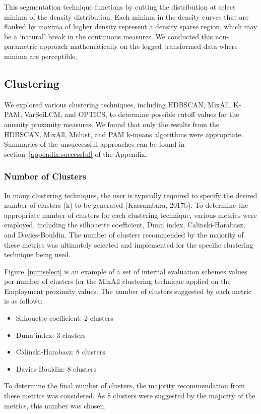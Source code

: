 \documentclass[11pt, a4paper]{article}
\begin{document}
This segmentation technique functions by cutting the distribution at select minima of the density distribution. Each minima in the density curves that are flanked by maxima of higher density represent a density sparse region, which may be a `natural' break in the continuous measures. We conducted this non-parametric approach mathematically on the logged transformed data where minima are perceptible.







\subsection{Clustering}


We explored various clustering techniques, including HDBSCAN, MixAll, K-PAM, VarSelLCM, and OPTICS, to determine possible cutoff values for the amenity proximity measures. We found that only the results from the HDBSCAN, MixAll, Mclust, and PAM k-means algorithms were appropriate. Summaries of the unsuccessful approaches can be found in section~\ref{appendix:successful} of the Appendix.





\subsubsection{Number of Clusters}

In many clustering techniques, the user is typically required to specify the desired number of clusters (k) to be generated (Kassambara, 2017b). To determine the appropriate number of clusters for each clustering technique, various metrics were employed, including the silhouette coefficient, Dunn index, Calinski-Harabasz, and Davies-Bouldin. The number of clusters recommended by the majority of these metrics was ultimately selected and implemented for the specific clustering technique being used.
\par
Figure~\ref{numselect} is an example of a set of internal evaluation schemes values per number of clusters for the MixAll clustering technique applied on the Employment proximity values. The number of clusters suggested by each metric is as follows:
\begin{itemize}
\item Silhouette coefficient: 2 clusters
\item Dunn index: 3 clusters
\item Calinski-Harabasz: 8 clusters
\item Davies-Bouldin: 8 clusters
\end{itemize}
To determine the final number of clusters, the majority recommendation from these metrics was considered. As 8 clusters were suggested by the majority of the metrics, this number was chosen.
\end{document}
